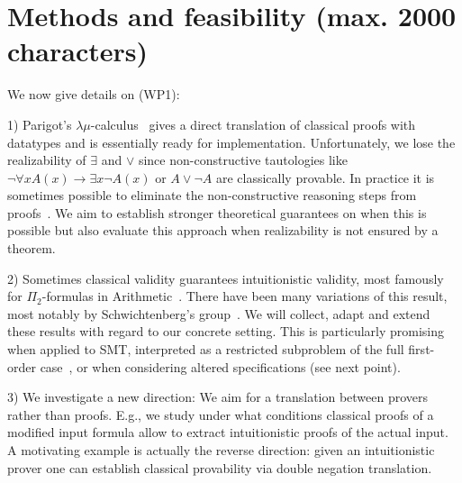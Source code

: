 \documentclass[a4paper,12pt]{article}
\begin{document}
	

\section{Methods and feasibility (max. 2000 characters)}
			
We now give details on (WP1):

1) Parigot's $\lambda\mu$-calculus~\cite{Parigot1} gives a direct translation of classical proofs with datatypes and is essentially ready for implementation.
Unfortunately, we lose the realizability of $\exists$ and $\vee$ since non-constructive tautologies like $\neg\forall xA(x)\to \exists x\neg A(x)$ or $A\vee \neg A$ are classically provable.
In practice it is sometimes possible to eliminate the non-constructive reasoning steps from proofs~\cite{practical}.
We aim to establish stronger theoretical guarantees on when this is possible but also evaluate this approach when realizability is not ensured by a theorem.

2) Sometimes classical validity guarantees intuitionistic validity, most famously for $\Pi_2$-formulas in Arithmetic~\cite{Friedman}. There have been many variations of this result, most notably by Schwichtenberg's group~\cite{schwichtenberg}.
We will collect, adapt and extend these results with regard to our concrete setting.
This is particularly promising when applied to SMT, interpreted as a restricted subproblem of the full first-order case~\cite{reynolds2015counterexample}, or when considering altered specifications (see next point).

3) We investigate a new direction:
We aim for a translation between provers rather than proofs.
E.g., we study under what conditions classical proofs of a modified input formula allow to extract intuitionistic proofs of the actual input.
A motivating example is actually the reverse direction:
given an intuitionistic prover one can establish classical provability via double negation translation.
	
\end{document}

